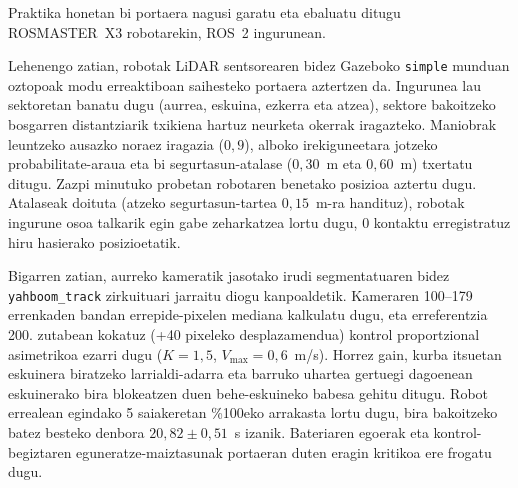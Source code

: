 Praktika honetan bi portaera nagusi garatu eta ebaluatu ditugu ROSMASTER~X3 robotarekin, ROS~2 ingurunean.

Lehenengo zatian, robotak LiDAR sentsorearen bidez Gazeboko \texttt{simple} munduan oztopoak modu erreaktiboan saihesteko portaera aztertzen da. Ingurunea lau sektoretan banatu dugu (aurrea, eskuina, ezkerra eta atzea), sektore bakoitzeko bosgarren distantziarik txikiena hartuz neurketa okerrak iragazteko. Maniobrak leuntzeko ausazko noraez iragazia ($0{,}9$), alboko irekiguneetara jotzeko probabilitate-araua eta bi segurtasun-atalase ($0{,}30$~m eta $0{,}60$~m) txertatu ditugu. Zazpi minutuko probetan robotaren benetako posizioa aztertu dugu. Atalaseak doituta (atzeko segurtasun-tartea $0{,}15$~m-ra handituz), robotak ingurune osoa talkarik egin gabe zeharkatzea lortu dugu, 0 kontaktu erregistratuz hiru hasierako posizioetatik.

Bigarren zatian, aurreko kameratik jasotako irudi segmentatuaren bidez \texttt{yahboom\_track} zirkuituari jarraitu diogu kanpoaldetik. Kameraren 100--179 errenkaden bandan errepide-pixelen mediana kalkulatu dugu, eta erreferentzia 200. zutabean kokatuz (+40 pixeleko desplazamendua) kontrol proportzional asimetrikoa ezarri dugu ($K = 1{,}5$, $V_{\max} = 0{,}6$~m/s). Horrez gain, kurba itsuetan eskuinera biratzeko larrialdi-adarra eta barruko uhartea gertuegi dagoenean eskuinerako bira blokeatzen duen behe-eskuineko babesa gehitu ditugu. Robot errealean egindako 5 saiakeretan \%100eko arrakasta lortu dugu, bira bakoitzeko batez besteko denbora $20{,}82 \pm 0{,}51$~s izanik. Bateriaren egoerak eta kontrol-begiztaren eguneratze-maiztasunak portaeran duten eragin kritikoa ere frogatu dugu.
